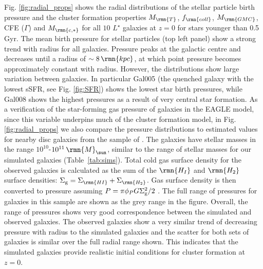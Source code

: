 \documentclass[fleqn,usenatbib]{mnras}
\newcommand\Msun{\,\rmn{M}_{\sun}}
\newcommand\kpc{\,\rmn{kpc}}
\newcommand{\numgal}{10}
\newcommand{\Mcstar}{M_\rmn{c,\ast}}
\newcommand{\Mtoomre}{M_\rmn{T}}
\newcommand{\Mgmc}{M_\rmn{GMC}}
\begin{document}
Fig. \ref{fig:radial_props} shows the radial distributions of the stellar particle birth pressure and the cluster formation properties $\Mtoomre$, $f_\rmn{coll}$, $\Mgmc$, CFE ($\Gamma$) and $\Mcstar$ for all $\numgal$ $L^\star$ galaxies at $z=0$ for stars younger than 0.5 Gyr. 
The mean birth pressure for stellar particles (top left panel) show a strong trend with radius for all galaxies. Pressure peaks at the galactic centre and decreases until a radius of $\sim8 \kpc$, at which point pressure becomes approximately constant with radius. However, the distributions show large variation between galaxies. In particular Gal005 (the quenched galaxy with the lowest sSFR, see Fig. \ref{fig:SFR}) shows the lowest star birth pressures, while Gal008 shows the highest pressures as a result of very central star formation.
As a verification of the star-forming gas pressure of galaxies in the EAGLE model, since this variable underpins much of the cluster formation model, in Fig. \ref{fig:radial_props} we also compare the pressure distributions to estimated values for nearby disc galaxies from the sample of \citet[where we include only those galaxies with CO measurements]{Leroy_et_al_08}. The galaxies have stellar masses in the range $10^{10}$-$10^{11} \Msun$, similar to the range of stellar masses for our simulated galaxies (Table~\ref{tab:sims}).
Total cold gas surface density for the observed galaxies is calculated as the sum of the $\rmn{H_I}$ and $\rmn{H_2}$ surface densities: $\Sigma_{\rm g} = \Sigma_\rmn{HI} + \Sigma_\rmn{H_2}$. Gas surface density is then converted to pressure assuming $P = \pi \phi_P G \Sigma_{\rm g}^2 / 2$ \citep[with $\phi_P = 3$,][]{Krumholz_and_McKee_05}. The full range of pressures for galaxies in this sample are shown as the grey range in the figure.
Overall, the range of pressures shows very good correspondence between the simulated and observed galaxies. The observed galaxies show a very similar trend of decreasing pressure with radius to the simulated galaxies and the scatter for both sets of galaxies is similar over the full radial range shown. This indicates that the simulated galaxies provide realistic initial conditions for cluster formation at $z=0$.
\end{document}
